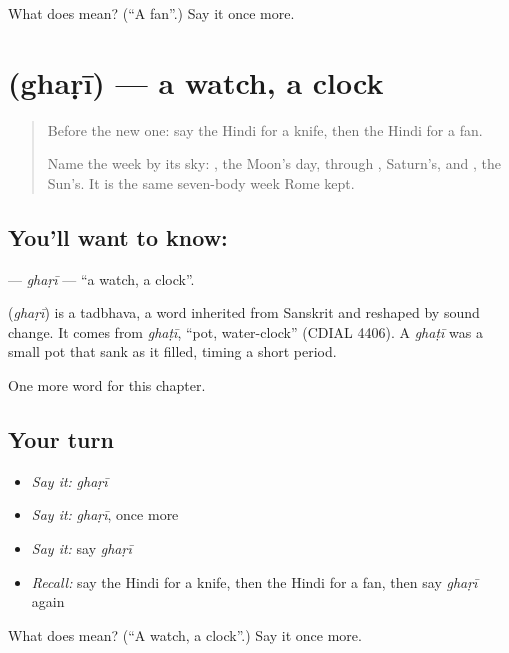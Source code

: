 \begin{tcolorbox}[breakable,colback=teal!4,colframe=teal!35!black,title={Before you move on}]
What does  mean? (\textquotedblleft{}A fan\textquotedblright{}.) Say it once more.
\end{tcolorbox}
\section[\texorpdfstring{\hi{घड़ी} (ghaṛī)}{घड़ी (ghaṛī)}]{ (ghaṛī) — a watch, a clock}

\label{lesson:HI-C132-ghari}



\begin{quote}
Before the new one: say the Hindi for a knife, then the Hindi for a fan.

Name the week by its sky: \textbf{}, the Moon's day, through \textbf{}, Saturn's, and \textbf{}, the Sun's. It is the same seven-body week Rome kept.
\end{quote}

\subsection*{You'll want to know: }
\textbf{} — \emph{ghaṛī} — \textquotedblleft{}a watch, a clock\textquotedblright{}.

\begin{cousinweb}
\textbf{} (\emph{ghaṛī}) is a tadbhava, a word inherited from Sanskrit and reshaped by sound change. It comes from \emph{ghaṭī}, \textquotedblleft{}pot, water-clock\textquotedblright{} (CDIAL 4406). A \emph{ghaṭī} was a small pot that sank as it filled, timing a short period.
\end{cousinweb}

\begin{grammarlens}[title={What you've built}]
One more word for this chapter.
\end{grammarlens}

\subsection*{Your turn}
\begin{itemize}
\raggedright
  \item \emph{Say it:} \emph{ghaṛī}
  \item \emph{Say it:} \emph{ghaṛī}, once more
  \item \emph{Say it:} say \emph{ghaṛī}
  \item \emph{Recall:} say the Hindi for a knife, then the Hindi for a fan, then say \emph{ghaṛī} again
\end{itemize}

\begin{tcolorbox}[breakable,colback=teal!4,colframe=teal!35!black,title={Before you move on}]
What does  mean? (\textquotedblleft{}A watch, a clock\textquotedblright{}.) Say it once more.
\end{tcolorbox}
